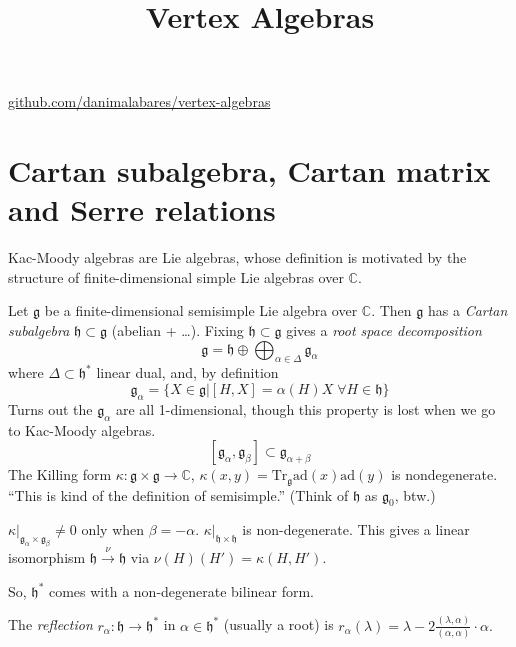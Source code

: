 



\title{Vertex Algebras}
\maketitle

\label{section-phantom}
\hfill
\href{http://github.com/danimalabares/vertex%
-algebras}
{github.com/danimalabares/vertex-algebras}

\tableofcontents

\section{Cartan subalgebra, Cartan matrix and
Serre relations}
\label{section-Cartan-subalgebra}

Kac-Moody algebras are Lie algebras, whose
definition is motivated by the
structure of finite-dimensional simple Lie
algebras over $\mathbb{C}$.

Let $\mathfrak{g}$ be a finite-dimensional
semisimple Lie algebra over
$\mathbb{C}$. Then $\mathfrak{g}$ has a {\it
Cartan subalgebra}
$\mathfrak{h}\subset \mathfrak{g}$ (abelian +
…).
Fixing $\mathfrak{h}\subset\mathfrak{g}$
gives a
{\it root space decomposition}
$$
\mathfrak{g}=\mathfrak{h}\oplus
\bigoplus_{\alpha \in
\Delta}\mathfrak{g}_\alpha
$$
where $\Delta \subset \mathfrak{h}^*$ linear
dual, and, by definition
$$
\mathfrak{g}_\alpha=\{X \in \mathfrak{g}|
[H,X]=\alpha(H)X\; \forall H \in
\mathfrak{h}\}
$$
Turns out the $\mathfrak{g}_\alpha$ are all
1-dimensional,
though this property is lost when we go to
Kac-Moody algebras.
$$
[\mathfrak{g}_\alpha,\mathfrak{g}_\beta]
\subset \mathfrak{g}_{\alpha+\beta}
$$
The Killing form  $\kappa:\mathfrak{g} \times
\mathfrak{g} \to \mathbb{C}$,
 $\kappa(x,y)=\text{Tr}_\mathfrak{g}\text{ad}
 (x)\text{ad}(y)$
 is nondegenerate.
``This is kind of the definition of
semisimple.''
(Think of $\mathfrak{h}$ as $\mathfrak{g}_0$,
btw.)

$\kappa |_{\mathfrak{g}_\alpha \times
\mathfrak{g}_\beta}\neq 0$ only when
$\beta=-\alpha$. $\kappa
|_{\mathfrak{h}\times \mathfrak{h}}$ is
non-degenerate.
 This gives a linear isomorphism
$\mathfrak{h} \xrightarrow{\nu} \mathfrak{h}$
via
$\nu(H)(H') = \kappa(H,H')$.

\medskip\noindent
So, $\mathfrak{h}^*$ comes with a
non-degenerate bilinear form.

The {\it reflection}
$r_\alpha:\mathfrak{h}\to \mathfrak{h}^*$ in
$\alpha \in \mathfrak{h}^*$ (usually a root)
is
$r_\alpha(\lambda)=\lambda-
2\frac{(\lambda,\alpha)}{(\alpha,\alpha)}
\cdot \alpha.$

